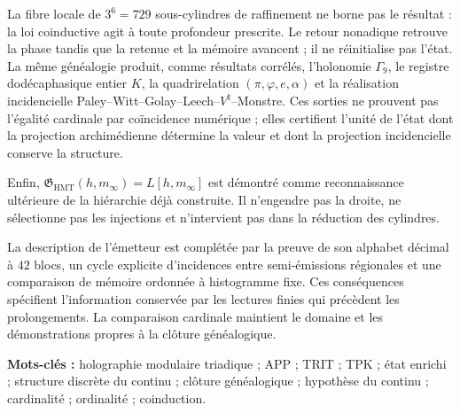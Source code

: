 La fibre locale de \(3^6=729\) sous-cylindres de raffinement ne borne pas le
résultat : la loi coinductive agit à toute profondeur prescrite. Le retour
nonadique retrouve la phase tandis que la retenue et la mémoire avancent ; il ne réinitialise pas
l’état. La même généalogie produit, comme résultats corrélés,
l’holonomie \(\Gamma_9\), le registre dodécaphasique entier \(K\), la
quadrirelation \((\pi,\varphi,e,\alpha)\) et la réalisation incidencielle
Paley--Witt--Golay--Leech--\(V^\natural\)--Monstre. Ces sorties ne prouvent pas
l’égalité cardinale par coïncidence numérique ; elles certifient l’unité de
l’état dont la projection archimédienne détermine la valeur et dont la projection
incidencielle conserve la structure.

Enfin,
\(\mathfrak G_{\mathrm{HMT}}(h,m_\infty)=L[h,m_\infty]\) est démontré comme
reconnaissance ultérieure de la hiérarchie déjà construite. Il n’engendre pas la droite,
ne sélectionne pas les injections et n’intervient pas dans la réduction des cylindres.

\medskip

La description de l’émetteur est complétée par la preuve de son alphabet
décimal à \(42\) blocs, un cycle explicite d’incidences entre
semi-émissions régionales et une comparaison de mémoire ordonnée à
histogramme fixe. Ces conséquences spécifient l’information
conservée par les lectures finies qui précèdent les prolongements.
La comparaison cardinale maintient le domaine et les démonstrations
propres à la clôture généalogique.

\noindent\textbf{Mots-clés :} holographie modulaire triadique ; APP ; TRIT ; TPK ; état enrichi ; structure discrète du continu ; clôture généalogique ; hypothèse du continu ; cardinalité ; ordinalité ; coinduction.
\endgroup
